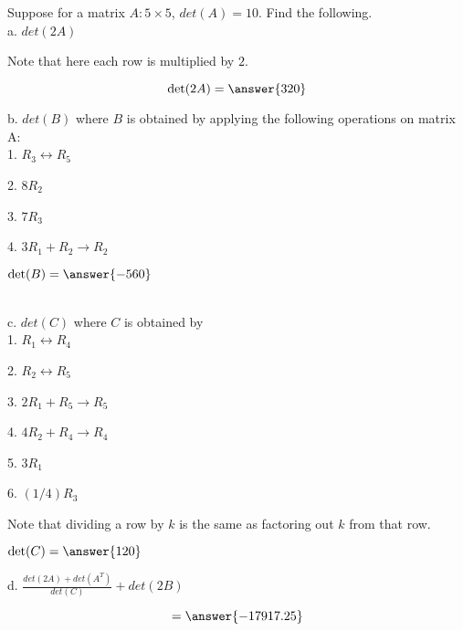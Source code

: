\documentclass{ximera}
\author{Parisa Fatheddin}
\begin{document}
\begin{exercise}


Suppose for a matrix $A: 5\times 5$, $det(A)=10$. Find the following. \\

a. $det(2A)$\\

\begin{prompt}
\begin{hint}
Note that here each row is multiplied by $2$.
\end{hint}
\[ \text{det}(2A)= \answer{320}\]
\end{prompt}

b. $det(B)$ where $B$ is obtained by applying the following operations on matrix A:\\

1. $R_{3} \leftrightarrow R_{5}$

2. $8R_{2}$

3. $7 R_{3}$

4. $3R_{1}+ R_{2} \rightarrow R_{2}$

\begin{prompt}
$\text{det}(B)= \answer{-560}$
\end{prompt}\\


c. $det(C)$ where $C$ is obtained by\\

1. $R_{1}\leftrightarrow R_{4}$

2. $R_{2} \leftrightarrow R_{5}$

3. $2R_{1} + R_{5} \rightarrow R_{5}$

4. $4R_{2} + R_{4} \rightarrow R_{4}$

5. $3R_{1}$

6. $(1/4) R_{3}$

\begin{prompt}
\begin{hint}
Note that dividing a row by $k$ is the same as factoring out $k$ from that row.
\end{hint}
$\text{det}(C) = \answer{120}$
\end{prompt}

d. $\frac{det(2A) + det (A^T)}{det(C)} + det(2B)$ \\

\begin{prompt}
\[ = \answer{-17917.25}\]
\end{prompt}















\end{exercise}
\end{document}
